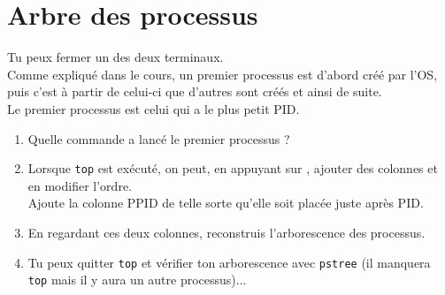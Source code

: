 \documentclass[a4paper,12pt,french]{book}
\begin{document}
\section*{Arbre des processus}
Tu peux fermer un des deux terminaux.\\

Comme expliqué dans le cours, un premier processus est d'abord créé par l'OS, puis c'est à partir de celui-ci que d'autres sont créés et ainsi de suite.\\
Le premier processus est celui qui a le plus petit PID.\\
\begin{enumerate}[\bfseries 1.]
	\item 	Quelle commande a lancé le premier processus ?
	\item 	Lorsque \texttt{top} est exécuté, on peut, en appuyant sur  , ajouter des colonnes et en modifier l'ordre.\\
            Ajoute la colonne PPID de telle sorte qu'elle soit placée juste après PID.
     \item 	En regardant ces deux colonnes, reconstruis l'arborescence des processus.
     \item 	Tu peux quitter \texttt{top} et vérifier ton arborescence avec \texttt{pstree} (il manquera \texttt{top} mais il y aura un autre processus)...
     \end{enumerate}

\newpage
\end{document}
